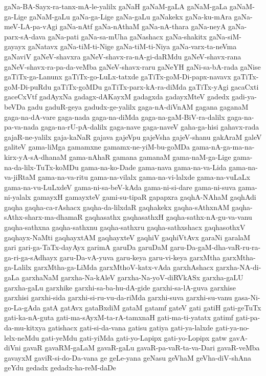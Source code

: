 {gaNa-BA-Sayx-ra-tanx-mA-le-yalilx
gaNaH
gaNaM-gaLA
gaNaM-gaLa
gaNaM-ga-Lige
gaNaM-gaLu
gaNa-ga-Lige
gaNa-gaLu
gaNakekx
gaNa-ku-mAra
gaNa-meV-LA-pa-vAgi
gaNa-nAtf
gaNa-nAthaM
gaNa-nA-thara
gaNa-neyA
gaNa-parx-sA-dava
gaNa-pati
gaNa-sa-mUha
gaNashacx
gaNa-shakitx
gaNa-siM-gayayx
gaNatavx
gaNa-tiM-ti-Nige
gaNa-tiM-ti-Niya
gaNa-varx-ta-neVma
gaNaviV
gaNeV-shavxra
gaNeV-shavx-ra-nA-gi-daRMdu
gaNeV-shavx-rana
gaNeV-shavx-ra-pa-da-veMba
gaNeV-shavx-raru
gaNeYH
gaNi-sa-bA-rada
gaNise
gaTiTx-ga-Lanunx
gaTiTx-go-LuLx-tatxde
gaTiTx-goM-Di-papx-navavx
gaTiTx-goM-Di-puRdu
gaTiTx-goMDu
gaTiTx-parx-kA-ra-diMda
gaTiTx-yAgi
gacaCxti
gaceCxVtf
gadAyxNa
gadagx-dAKayxM
gadagxda
gadayxMteV
gadedx
gadi-ya-beVDa
gadu
gaduR-geya
gadudx-ge-yalilx
gaga-nA-diVnAM
gagana
gaganaM
gaga-na-dA-vare
gaga-nada
gaga-na-diMda
gaga-na-gaM-BiV-ra-dalilx
gaga-na-pa-va-nada
gaga-na-rU-pA-dalilx
gaga-nave
gaga-naveV
gaha-ga-hisi
gahavx-rada
gajaR-ne-yalilx
gaja-kaNaR
gajava
gajeVpu
gajeVsha
gajeV-shanu
gakAraM
galeV
galiteV
gama-liMga
gamamxne
gamamx-ne-yiM-bu-goMDa
gama-nA-ga-ma-na-kirx-yA-sA-dhanaM
gama-nAhaR
gamana
gamanaM
gama-naM-ga-Lige
gama-na-da-lilx-TuTx-koMDu
gama-na-ko-Dade
gama-nava
gama-na-va-Lida
gama-na-va-jiRtaM
gama-na-va-ritu
gama-na-vilalx
gama-na-vi-lalxde
gama-na-vuLaLx
gama-na-vu-LuLxdeV
gama-ni-sa-beV-kAda
gama-ni-si-dare
gama-ni-suva
gama-ni-yalalx
gamayxH
gamayxteV
gami-su-tipaR
gapapxra
gaqhA-NAhaM
gaqhAdi
gaqha
gaqha-ca-rAshacx
gaqha-da-lilxdaR
gaqhakekx
gaqha-sAthxnAM
gaqha-sAthx-sharx-ma-dhamaR
gaqhasathx
gaqhasathxH
gaqha-sathx-nA-gu-va-vanu
gaqha-sathxna
gaqha-sathxnu
gaqha-sathxru
gaqha-sathxshacx
gaqhasothxV
gaqhayx-NaMti
gaqhayxtAM
gaqhayxteV
gaqhiV
gaqhiVtAvx
garaNi
garalaM
gari
gari-ga-TaTx-dayAyx
garimA
garuDa
garuDaM
garu-Da-gaM-dha-vaR-ru-ra-ga-ri-ga-sAdhayx
garu-Da-vA-yuva
garu-keya
garu-vi-keya
garxMtha
garxMtha-ga-Lalilx
garxMtha-ga-LiMda
garxMthoV-katx-vAda
garxhAshacx
garxha-NA-di-gaLa
garxhaNaM
garxha-Na-kAleV
garxha-Na-yoV-diRVkASx
garxha-gaLU
garxha-gaLu
garxhike
garxhi-sa-ba-hu-dA-gide
garxhi-sa-lA-guva
garxhise
garxhisi
garxhi-sida
garxhi-si-ru-vu-da-riMda
garxhi-suva
garxhi-su-vanu
gasa-Ni-go-La-gAda
gatA
gatAvx
gataBxdiM
gataM
gatamf
gateV
gati
gatiH
gati-geTuTx
gati-ka-nA-guta
gati-ma-sAyxM-ta-rA-tamxnaH
gati-ma-ti-yatatx
gatimf
gati-pa-da-mu-kitxya
gatishacx
gati-si-da-vana
gatisu
gatiya
gati-ya-lalxde
gati-ya-no-lelx-neMdu
gati-yeMdu
gati-yiMda
gati-yo-Lapipx
gati-yo-Lopipx
gatw
gavA-diVni
gavaR
gavaRM-gaLaM
gavaR-gaLu
gavaR-pa-vaR-ta-va-Dari
gavaR-veMba
gavayxM
gaviR-si-do-Da-vana
ge
geLe-yana
geNasu
geVhaM
geVha-diV-shAna
geYdu
gedadx
gedadx-ha-reM-daDe
}
